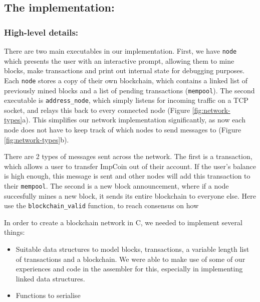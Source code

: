 \documentclass[a4paper]{article}
\begin{document}
\subsection{The implementation:}
\subsubsection{High-level details:}

There are two main executables in our implementation. First, we have \verb|node| which presents the user with an interactive prompt, allowing them to mine blocks, make transactions and print out internal state for debugging purposes. Each \verb|node| stores a copy of their own blockchain, which contains a linked list of previously mined blocks and a list of pending transactions (\verb|mempool|). The second executable is \verb|address_node|, which simply listens for incoming traffic on a TCP socket, and relays this back to every connected node (Figure \ref{fig:network-types}a). This simplifies our network implementation significantly, as now each node does not have to keep track of which nodes to send messages to (Figure \ref{fig:network-types}b).

There are 2 types of messages sent across the network. The first is a transaction, which allows a user to transfer ImpCoin out of their account. If the user's balance is high enough, this message is sent and other nodes will add this transaction to their \verb|mempool|. The second is a new block announcement, where if a node succesfully mines a new block, it sends its entire blockchain to everyone else. Here use the \verb|blockchain_valid| function, to reach consensus on how

In order to create a blockchain network in C, we needed to implement several things:
\begin{itemize}
    \item Suitable data structures to model blocks, transactions, a variable length list of transactions and a blockchain. We were able to make use of some of our experiences and code in the assembler for this, especially in implementing linked data structures.
    \item Functions to serialise 
\end{itemize}
\end{document}
